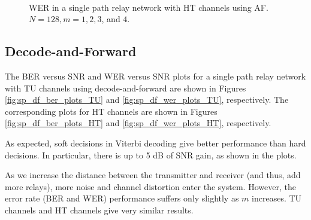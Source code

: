 \begin{figure}
{	 \\
}
\caption{WER in a single path relay network with HT channels using AF.  $N = 128, m = 1, 2, 3$, and $4$.}
\label{fig:sp_af_wer_plots_HT}
\end{figure}

\subsection{Decode-and-Forward}
\label{subsec:sp_bws_df}

The BER versus SNR and WER versus SNR plots for a single path relay network with TU channels using decode-and-forward are shown in Figures \ref{fig:sp_df_ber_plots_TU} and \ref{fig:sp_df_wer_plots_TU}, respectively.  The corresponding plots for HT channels are shown in Figures \ref{fig:sp_df_ber_plots_HT} and \ref{fig:sp_df_wer_plots_HT}, respectively.

As expected, soft decisions in Viterbi decoding give better performance than hard decisions.  In particular, there is up to 5 dB of SNR gain, as shown in the plots.

As we increase the distance between the transmitter and receiver (and thus, add more relays), more noise and channel distortion enter the system.  However, the error rate (BER and WER) performance suffers only slightly as $m$ increases.  TU channels and HT channels give very similar results.

